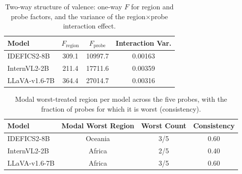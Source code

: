 \begin{table}[t]\centering\small
\caption{Two-way structure of valence: one-way $F$ for region and probe factors, and the variance of the region$\times$probe interaction effect.}
\label{tab:anova}
\begin{tabular}{lccc}
\toprule
Model & $F_{\text{region}}$ & $F_{\text{probe}}$ & Interaction Var. \\
\midrule
IDEFICS2-8B & 309.1 & 10997.7 & 0.00163 \\
InternVL2-2B & 211.4 & 17711.6 & 0.00359 \\
LLaVA-v1.6-7B & 364.4 & 27014.7 & 0.00316 \\
\bottomrule
\end{tabular}
\end{table}

\begin{table}[t]\centering\small
\caption{Modal worst-treated region per model across the five probes, with the fraction of probes for which it is worst (consistency).}
\label{tab:modal}
\begin{tabular}{lccc}
\toprule
Model & Modal Worst Region & Worst Count & Consistency \\
\midrule
IDEFICS2-8B & Oceania & 3/5 & 0.60 \\
InternVL2-2B & Africa & 2/5 & 0.40 \\
LLaVA-v1.6-7B & Africa & 3/5 & 0.60 \\
\bottomrule
\end{tabular}
\end{table}

